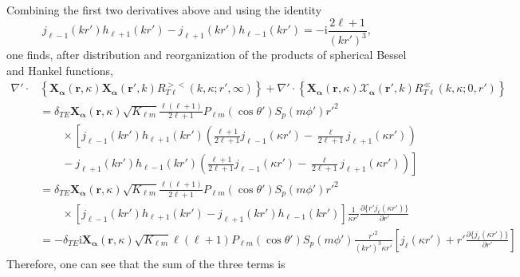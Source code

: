 Combining the first two derivatives above and using the identity
\begin{equation}
j_{\ell - 1}(kr')h_{\ell + 1}(kr') - j_{\ell + 1}(kr')h_{\ell - 1}(kr') = -\mathrm{i}\frac{2\ell + 1}{(kr')^3},
\end{equation}
one finds, after distribution and reorganization of the products of spherical Bessel and Hankel functions, 
\begin{equation}
\begin{split}
\nabla'\cdot&\left\{\mathbf{X}_{\bm{\alpha}}(\mathbf{r},\kappa)\mathbf{X}_{\bm{\alpha}}(\mathbf{r}',k)R_{T\ell}^{><}(k,\kappa;r',\infty)\right\} + \nabla'\cdot\left\{\mathbf{X}_{\bm{\alpha}}(\mathbf{r},\kappa)\bm{\mathcal{X}}_{\bm{\alpha}}(\mathbf{r}',k)R_{T\ell}^\ll(k,\kappa;0,r')\right\}\\
&=\delta_{TE}\mathbf{X}_{\bm{\alpha}}(\mathbf{r},\kappa)\sqrt{K_{\ell m}}\frac{\ell(\ell + 1)}{2\ell + 1}P_{\ell m}(\cos\theta')S_p(m\phi')r'^2\\
&\qquad\times\left[j_{\ell - 1}(kr')h_{\ell + 1}(kr')\left(\frac{\ell + 1}{2\ell + 1}j_{\ell - 1}(\kappa r') - \frac{\ell}{2\ell + 1}j_{\ell + 1}(\kappa r')\right)\right.\\
&\qquad-\left.j_{\ell + 1}(kr')h_{\ell - 1}(kr')\left(\frac{\ell + 1}{2\ell + 1}j_{\ell - 1}(\kappa r') - \frac{\ell}{2\ell + 1}j_{\ell + 1}(\kappa r')\right)\right]\\
&= \delta_{TE}\mathbf{X}_{\bm{\alpha}}(\mathbf{r},\kappa)\sqrt{K_{\ell m}}\frac{\ell(\ell + 1)}{2\ell + 1}P_{\ell m}(\cos\theta')S_p(m\phi')r'^2\\
&\qquad\times\left[j_{\ell - 1}(kr')h_{\ell + 1}(kr') - j_{\ell + 1}(kr')h_{\ell - 1}(kr')\right]\frac{1}{\kappa r'}\frac{\partial\{r'j_\ell(\kappa r')\}}{\partial r'}\\
&= -\delta_{TE}\mathrm{i}\mathbf{X}_{\bm{\alpha}}(\mathbf{r},\kappa)\sqrt{K_{\ell m}}\ell(\ell + 1)P_{\ell m}(\cos\theta')S_p(m\phi')\frac{r'^2}{(kr')^3\kappa r'}\left[j_\ell(\kappa r') + r'\frac{\partial\{j_\ell(\kappa r')\}}{\partial r'}\right]
\end{split}
\end{equation}
Therefore, one can see that the sum of the three terms is
